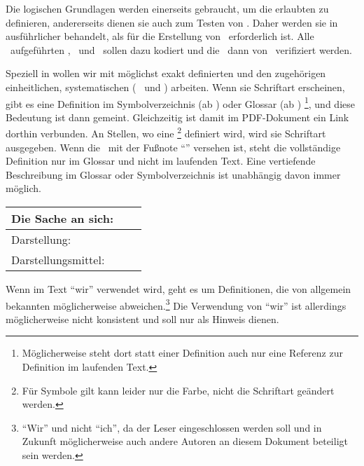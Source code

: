\footnoteForNotDefinedItem

\begin{offen}%
	Die logischen Grundlagen werden einerseits gebraucht, um die erlaubten \Beweisschritte{} zu definieren, andererseits dienen sie auch zum Testen von \ASBA.
	Daher werden sie in  ausführlicher behandelt, als für die Erstellung von \ASBA\ erforderlich ist.
	Alle \hier\ aufgeführten \Axiome, \Saetze\ und \Beweise\ sollen dazu kodiert und die \Beweise\ dann von \ASBA\ verifiziert werden.
\end{offen}%

Speziell in  wollen wir mit möglichst exakt definierten  und den zugehörigen einheitlichen, systematischen  (\textdh\  und \Symbolen) arbeiten.
Wenn sie  Schriftart erscheinen, gibt es eine Definition im Symbolverzeichnis (ab ) oder Glossar (ab )%
\footnote{%
	Möglicherweise steht dort statt einer Definition auch nur eine Referenz zur Definition im laufenden Text.
},
und diese Bedeutung ist dann gemeint.
Gleichzeitig ist damit im PDF-Dokument ein Link dorthin verbunden.
An Stellen, wo eine \Benennung\footnote{%
	Für Symbole gilt kann leider nur die Farbe, nicht die Schriftart geändert werden.%
} definiert wird, wird sie  Schriftart ausgegeben.
Wenn die \Benennung\ mit der Fußnote "`\footnotemark[0]"' versehen ist, steht die vollständige Definition nur im Glossar und nicht im laufenden Text.
Eine vertiefende Beschreibung im Glossar oder Symbolverzeichnis ist unabhängig davon immer möglich.

\begin{center}
	\begin{tabular}{|l|c|c|}
		\hline
		Die Sache an sich:  & \multicolumn{2}{c|}{\Begriff}     \\
		\hline
		Darstellung:        & \multicolumn{2}{c|}{\Bezeichnung} \\
		Darstellungsmittel: & \Benennung      & \Symbol         \\
		\hline
	\end{tabular}
\end{center}

Wenn im Text "`wir"' verwendet wird, geht es um Definitionen, die von allgemein bekannten möglicherweise abweichen.\footnote{%
	"`Wir"' und nicht "`ich"', da der Leser eingeschlossen werden soll und in Zukunft möglicherweise auch andere Autoren an diesem Dokument beteiligt sein werden.
}
Die Verwendung von "`wir"' ist allerdings möglicherweise nicht konsistent und soll nur als Hinweis dienen.

